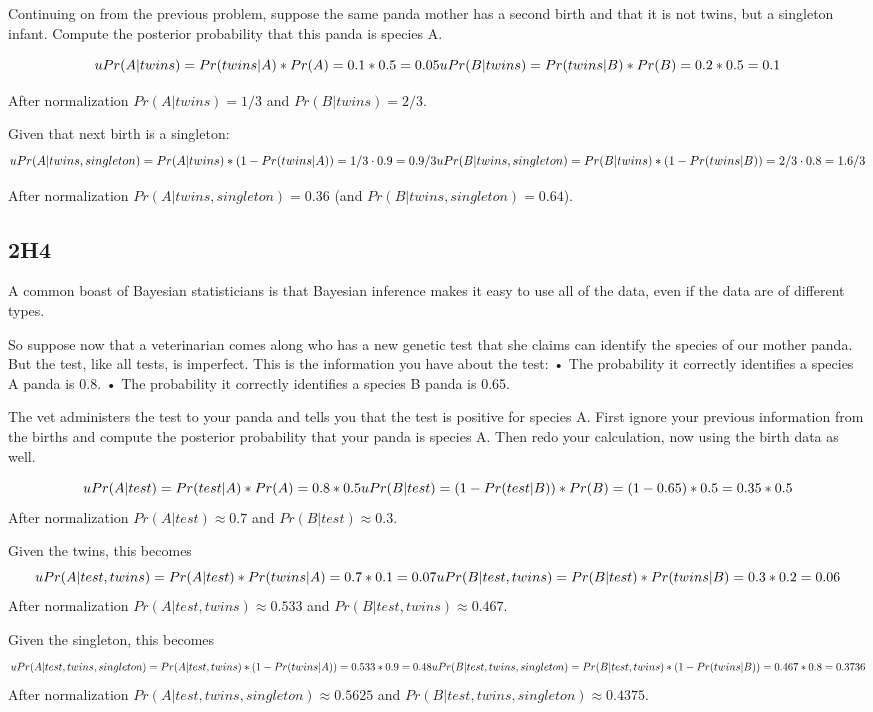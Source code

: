 \documentclass[
]{book}
\begin{document}
Continuing on from the previous problem, suppose the same panda mother has a second birth and that it is not twins, but a singleton infant. Compute the posterior probability that this panda is species A.

\[uPr(A | twins) = Pr(twins | A) * Pr(A) = 0.1 * 0.5 = 0.05 \\
uPr(B | twins) = Pr(twins | B) * Pr(B) = 0.2 * 0.5 = 0.1\]

After normalization \(Pr(A | twins) = 1/3\) and \(Pr(B | twins) = 2/3\).

Given that next birth is a singleton:
\[uPr(A | twins, singleton) = Pr(A | twins) * (1 - Pr(twins|A)) = 1/3 \cdot 0.9 = 0.9/3\\
uPr(B | twins, singleton) = Pr(B | twins) * (1 - Pr(twins|B)) = 2/3 \cdot 0.8 = 1.6/3\]

After normalization \(Pr(A | twins, singleton) = 0.36\) (and \(Pr(B | twins, singleton) = 0.64\)).

\hypertarget{h4}{%
\subsection*{2H4}\label{h4}}

A common boast of Bayesian statisticians is that Bayesian inference makes it easy to use all of the data, even if the data are of different types.

So suppose now that a veterinarian comes along who has a new genetic test that she claims can identify the species of our mother panda. But the test, like all tests, is imperfect. This is the information you have about the test:
• The probability it correctly identifies a species A panda is 0.8.
• The probability it correctly identifies a species B panda is 0.65.

The vet administers the test to your panda and tells you that the test is positive for species A. First ignore your previous information from the births and compute the posterior probability that your panda is species A. Then redo your calculation, now using the birth data as well.

\[uPr(A | test) = Pr(test | A) * Pr (A) = 0.8 * 0.5\\
uPr(B | test) = (1 - Pr(test | B)) * Pr (B) = (1 - 0.65) * 0.5 = 0.35 * 0.5\]
After normalization \(Pr(A | test) \approx 0.7\) and \(Pr(B | test) \approx 0.3\).

Given the twins, this becomes
\[uPr(A | test, twins) = Pr(A | test) * Pr(twins | A) = 0.7 * 0.1 = 0.07\\
uPr(B | test, twins) = Pr(B | test) * Pr(twins | B) = 0.3 * 0.2 = 0.06\]
After normalization \(Pr(A | test, twins) \approx 0.533\) and \(Pr(B | test, twins) \approx 0.467\).

Given the singleton, this becomes
\[uPr(A | test, twins, singleton) = Pr(A | test, twins) * (1 - Pr(twins | A)) = 0.533 * 0.9 = 0.48\\
uPr(B | test, twins, singleton) = Pr(B | test, twins) * (1 - Pr(twins | B)) = 0.467 * 0.8 = 0.3736\]
After normalization \(Pr(A | test, twins, singleton) \approx 0.5625\) and \(Pr(B | test, twins, singleton) \approx 0.4375\).

  
\end{document}
